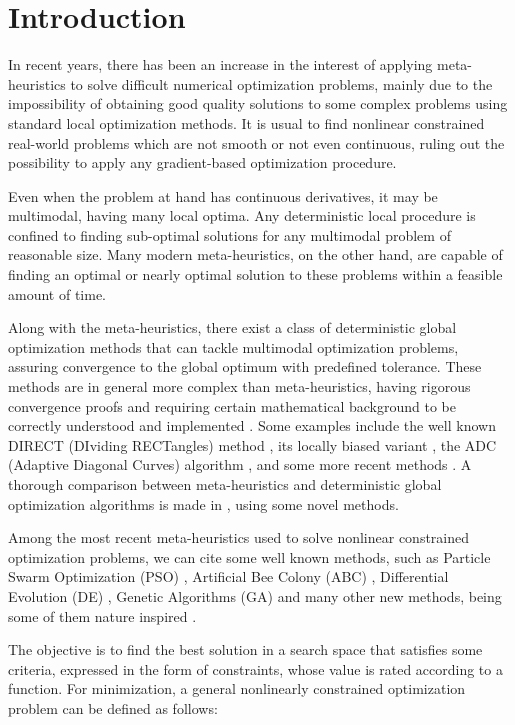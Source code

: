 \section{Introduction} \label{sec:Introduction}

In recent years, there has been an increase in the interest of applying meta-heuristics to solve difficult numerical optimization problems, mainly due to the impossibility of obtaining good quality solutions to some complex problems using standard local optimization methods. It is usual to find nonlinear constrained real-world problems which are not smooth or not even continuous, ruling out the possibility to apply any gradient-based optimization procedure.

Even when the problem at hand has continuous derivatives, it may be multimodal, having many local optima. Any deterministic local procedure is confined to finding sub-optimal solutions for any multimodal problem of reasonable size. Many modern meta-heuristics, on the other hand, are capable of finding an optimal or nearly optimal solution to these problems within a feasible amount of time.

Along with the meta-heuristics, there exist a class of deterministic global optimization methods that can tackle multimodal optimization problems, assuring convergence to the global optimum with predefined tolerance. These methods are in general more complex than meta-heuristics, having rigorous convergence proofs and requiring certain mathematical background to be correctly understood and implemented \citep{BOOKS1, BOOKS2, NAT}. Some examples include the well known DIRECT (DIviding RECTangles) method \citep{DIRECT}, its locally biased variant \citep{DIRECTL}, the ADC (Adaptive Diagonal Curves) algorithm \citep{ADC}, and some more recent methods \cite{ADC2, SGEO, SIMP}. A thorough comparison between meta-heuristics and deterministic global optimization algorithms is made in \cite{NAT}, using some novel methods.

Among the most recent meta-heuristics used to solve nonlinear constrained optimization problems, we can cite some well known methods, such as Particle Swarm Optimization (PSO) \citep{IPSO, IAPSO, PSO1}, Artificial Bee Colony (ABC) \citep{CB-ABC, IABC-Mal}, Differential Evolution (DE) \citep{DE1, DE2, MVDE}, Genetic Algorithms (GA) \citep{GA1} and many other new methods, being some of them nature inspired \citep{CS, WCA, MBA}.

The objective is to find the best solution in a search space that satisfies some criteria, expressed in the form of constraints, whose value is rated according to a function. For minimization, a general nonlinearly constrained optimization problem can be defined as follows: \\[-3em]

